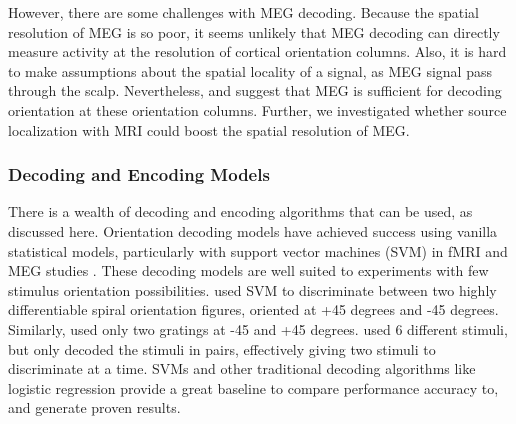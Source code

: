 \documentclass[../main.tex]{subfiles}
\begin{document}
However, there are some challenges with MEG decoding. Because the spatial resolution of MEG is so poor, it seems unlikely that MEG decoding can directly measure activity at the resolution of cortical orientation columns. Also, it is hard to make assumptions about the spatial locality of a signal, as MEG signal pass through the scalp. Nevertheless, \cite{cichy_ramirez_pantazis_2015} and \cite{ pantazis_fang_qin_mohsenzadeh_li_cichy_2018} suggest that MEG is sufficient for decoding orientation at these orientation columns. Further, we investigated whether source localization with MRI could boost the spatial resolution of MEG. 

\subsubsection{Decoding and Encoding Models}
There is a wealth of decoding and encoding algorithms that can be used, as discussed here. Orientation decoding models have achieved success using vanilla statistical models, particularly with support vector machines (SVM) in fMRI \citep{mannion_mcdonald_clifford_2009} and MEG studies \citep{cichy_ramirez_pantazis_2015, pantazis_fang_qin_mohsenzadeh_li_cichy_2018}. These decoding models are well suited to experiments with few stimulus orientation possibilities. \cite{mannion_mcdonald_clifford_2009} used SVM to discriminate between two highly differentiable spiral orientation figures, oriented at +45 degrees and -45 degrees. Similarly, \cite{cichy_ramirez_pantazis_2015} used only two gratings at -45 and +45 degrees. \cite{pantazis_fang_qin_mohsenzadeh_li_cichy_2018} used 6 different stimuli, but only decoded the stimuli in pairs, effectively giving two stimuli to discriminate at a time. SVMs and other traditional decoding algorithms like logistic regression provide a great baseline to compare performance accuracy to, and generate proven results.
\end{document}
